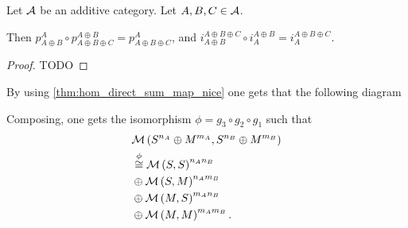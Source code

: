 \begin{lemma} \label{lem:projection_unique} %
    Let \( {\mathcal{A}} \) be an additive category. Let \( A, B, C \in {\mathcal{A}} \).

    Then \( p_{A \oplus B}^A \circ p_{A \oplus B \oplus C}^{A \oplus B} = p_{A \oplus B \oplus C}^A \), and \( i_{A \oplus B}^{A \oplus B \oplus C} \circ i_A^{A \oplus B} = i_A^{A \oplus B \oplus C} \).
\end{lemma}
\begin{proof}
    TODO
\end{proof}

\begin{remark} \label{rem:big_iso}
    By using \autoref{thm:hom_direct_sum_map_nice} one gets that the following diagram
    \begin{center}
    \end{center}
    
    
    Composing, one gets the isomorphism \( \phi = g_3 \circ g_2 \circ g_1 \) such that
    \begin{align*}
        &{\mathcal{M}}\left( S^{n_A} \oplus M^{m_A}, S^{n_B} \oplus M^{m_B} \right) \\
        &\stackrel{\phi}{\cong} {\mathcal{M}}\left(  S, S  \right)^{n_An_B} \\
        &\oplus {\mathcal{M}}\left(  S, M  \right)^{n_Am_B} \\
        &\oplus {\mathcal{M}}\left(  M, S  \right)^{m_An_B} \\
        &\oplus {\mathcal{M}}\left(  M, M  \right)^{m_Am_B}.
    \end{align*}


\end{remark}
